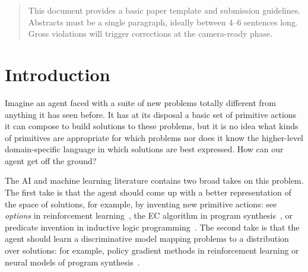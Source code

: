 \documentclass{article}
\begin{document}
\printAffiliationsAndNotice{\icmlEqualContribution} %

\begin{abstract}
This document provides a basic paper template and submission guidelines.
Abstracts must be a single paragraph, ideally between 4--6 sentences long.
Gross violations will trigger corrections at the camera-ready phase.
\end{abstract}

\section{Introduction}

Imagine an agent faced with a suite of new problems totally different
from anything it has seen before. It has at its disposal a basic set
of primitive actions it can compose to build solutions to these problems, but
it is no idea what kinds of primitives are appropriate for which
problems nor does it know the higher-level domain-specific language in
which solutions are best expressed.
How can our agent get off the ground?

The AI and machine learning literature contains two broad takes on this problem.
The first take is that the agent should come up with a better representation of the space of solutions,
for example, by inventing new primitive actions: see \emph{options} in reinforcement learning~\cite{stolle2002learning}, the EC algorithm in program synthesis~\cite{Dechter:2013:BLV:2540128.2540316}, or predicate invention in inductive logic programming~\cite{muggleton2015meta}.
The second take is that the agent should learn a discriminative model mapping problems to a distribution over solutions: for example, policy gradient methods in reinforcement learning or neural models of program synthesis~\cite{devlin2017robustfill}.
\end{document}
